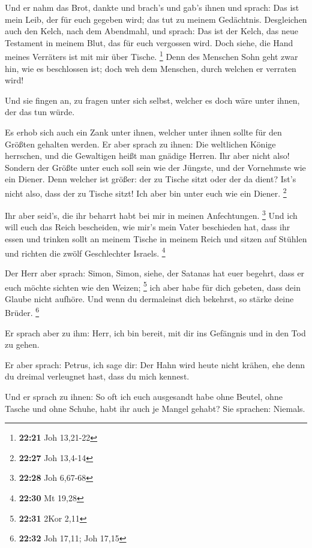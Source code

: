  Und er nahm das Brot, dankte und brach's und gab's ihnen
und sprach: Das ist mein Leib, der für euch gegeben wird; das tut zu
meinem Gedächtnis.  Desgleichen auch den Kelch, nach dem
Abendmahl, und sprach: Das ist der Kelch, das neue Testament in meinem
Blut, das für euch vergossen wird.  Doch siehe, die Hand
meines Verräters ist mit mir über Tische. \footnote{\textbf{22:21} Joh
  13,21-22}  Denn des Menschen Sohn geht zwar hin, wie es
beschlossen ist; doch weh dem Menschen, durch welchen er verraten wird!

 Und sie fingen an, zu fragen unter sich selbst, welcher es
doch wäre unter ihnen, der das tun würde.

 Es erhob sich auch ein Zank unter ihnen, welcher unter
ihnen sollte für den Größten gehalten werden.  Er aber
sprach zu ihnen: Die weltlichen Könige herrschen, und die Gewaltigen
heißt man gnädige Herren.  Ihr aber nicht also! Sondern der
Größte unter euch soll sein wie der Jüngste, und der Vornehmste wie ein
Diener.  Denn welcher ist größer: der zu Tische sitzt oder
der da dient? Ist's nicht also, dass der zu Tische sitzt! Ich aber bin
unter euch wie ein Diener. \footnote{\textbf{22:27} Joh 13,4-14}

 Ihr aber seid's, die ihr beharrt habt bei mir in meinen
Anfechtungen. \footnote{\textbf{22:28} Joh 6,67-68}  Und
ich will euch das Reich bescheiden, wie mir's mein Vater beschieden hat,
 dass ihr essen und trinken sollt an meinem Tische in
meinem Reich und sitzen auf Stühlen und richten die zwölf Geschlechter
Israels. \footnote{\textbf{22:30} Mt 19,28}

 Der Herr aber sprach: Simon, Simon, siehe, der Satanas hat
euer begehrt, dass er euch möchte sichten wie den Weizen; \footnote{\textbf{22:31}
  2Kor 2,11}  ich aber habe für dich gebeten, dass dein
Glaube nicht aufhöre. Und wenn du dermaleinst dich bekehrst, so stärke
deine Brüder. \footnote{\textbf{22:32} Joh 17,11; Joh 17,15}

 Er sprach aber zu ihm: Herr, ich bin bereit, mit dir ins
Gefängnis und in den Tod zu gehen.

 Er aber sprach: Petrus, ich sage dir: Der Hahn wird heute
nicht krähen, ehe denn du dreimal verleugnet hast, dass du mich kennest.

 Und er sprach zu ihnen: So oft ich euch ausgesandt habe
ohne Beutel, ohne Tasche und ohne Schuhe, habt ihr auch je Mangel
gehabt? Sie sprachen: Niemals.

